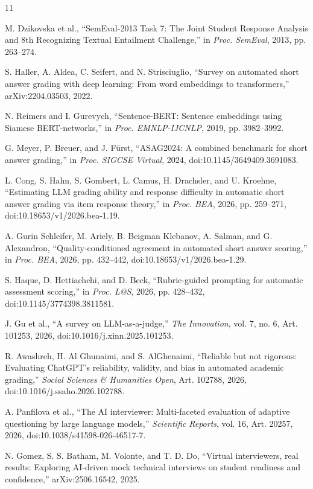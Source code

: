 \documentclass[conference,a4paper]{IEEEtran}
\begin{document}
\balance
\begin{thebibliography}{11}
\small

M. Dzikovska et al., ``SemEval-2013 Task 7: The Joint Student Response Analysis
and 8th Recognizing Textual Entailment Challenge,'' in \emph{Proc. SemEval},
2013, pp. 263--274.

S. Haller, A. Aldea, C. Seifert, and N. Strisciuglio, ``Survey on automated
short answer grading with deep learning: From word embeddings to
transformers,'' arXiv:2204.03503, 2022.

N. Reimers and I. Gurevych, ``Sentence-BERT: Sentence embeddings using Siamese
BERT-networks,'' in \emph{Proc. EMNLP-IJCNLP}, 2019, pp. 3982--3992.

G. Meyer, P. Breuer, and J. F{\"u}rst, ``ASAG2024: A combined benchmark for
short answer grading,'' in \emph{Proc. SIGCSE Virtual}, 2024,
doi:10.1145/3649409.3691083.

L. Cong, S. Hahn, S. Gombert, L. Camus, H. Drachsler, and U. Kroehne,
``Estimating LLM grading ability and response difficulty in automatic short
answer grading via item response theory,'' in \emph{Proc. BEA}, 2026,
pp. 259--271, doi:10.18653/v1/2026.bea-1.19.

A. Gurin Schleifer, M. Ariely, B. Beigman Klebanov, A. Salman, and
G. Alexandron, ``Quality-conditioned agreement in automated short answer
scoring,'' in \emph{Proc. BEA}, 2026, pp. 432--442,
doi:10.18653/v1/2026.bea-1.29.

S. Haque, D. Hettiachchi, and D. Beck, ``Rubric-guided prompting for automatic
assessment scoring,'' in \emph{Proc. L@S}, 2026, pp. 428--432,
doi:10.1145/3774398.3811581.

J. Gu et al., ``A survey on LLM-as-a-judge,'' \emph{The Innovation}, vol. 7,
no. 6, Art. 101253, 2026, doi:10.1016/j.xinn.2025.101253.

R. Awashreh, H. Al Ghunaimi, and S. AlGhenaimi, ``Reliable but not rigorous:
Evaluating ChatGPT's reliability, validity, and bias in automated academic
grading,'' \emph{Social Sciences \& Humanities Open}, Art. 102788, 2026,
doi:10.1016/j.ssaho.2026.102788.

A. Panfilova et al., ``The AI interviewer: Multi-faceted evaluation of adaptive
questioning by large language models,'' \emph{Scientific Reports}, vol. 16,
Art. 20257, 2026, doi:10.1038/s41598-026-46517-7.

N. Gomez, S. S. Batham, M. Volonte, and T. D. Do, ``Virtual interviewers, real
results: Exploring AI-driven mock technical interviews on student readiness
and confidence,'' arXiv:2506.16542, 2025.

\end{thebibliography}
\end{document}
